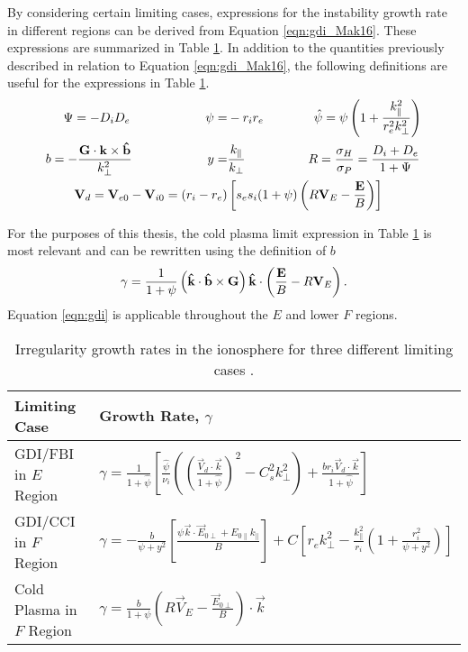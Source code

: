 By considering certain limiting cases, expressions for the instability growth rate in different regions can be derived from Equation \ref{eqn:gdi_Mak16}.  These expressions are summarized in Table \ref{tab:gdi_exps}.  In addition to the quantities previously described in relation to Equation \ref{eqn:gdi_Mak16}, the following definitions are useful for the expressions in Table \ref{tab:gdi_exps}.
\begin{equation}
\begin{split}
	\Psi = -D_iD_e \quad\quad\quad\quad\quad\quad
	\psi =& -r_ir_e \quad\quad\quad\quad
	\hat{\psi} = \psi\left(1+\frac{k_\parallel^2}{r_e^2 k_\perp^2}\right) \\
	b = -\frac{\mathbf{G}\cdot\mathbf{k}\times\mathbf{\hat{b}}}{k_\perp^2} \quad\quad\quad\quad\quad\quad
	y =& \frac{k_\parallel}{k_\perp} \quad\quad\quad\quad\quad
	R = \frac{\sigma_H}{\sigma_P} = \frac{D_i+D_e}{1+\Psi} \\
	\mathbf{V}_d = \mathbf{V}_{e0}-\mathbf{V}_{i0} = (r_i-r_e)&\left[s_es_i(1+\psi)\left(R\mathbf{V}_E-\frac{\mathbf{E}}{B}\right)\right]
\end{split}
\end{equation}

For the purposes of this thesis, the cold plasma limit expression in Table \ref{tab:gdi_exps} is most relevant and can be rewritten using the definition of \(b\) \citep{Makarevich2014c,Makarevich2016a}
\begin{equation}
	\label{eqn:gdi}
	\gamma = \frac{1}{1+\psi}\left(\mathbf{\hat{k}}\cdot\mathbf{\hat{b}}\times\mathbf{G}\right)\mathbf{\hat{k}}\cdot\left(\frac{\mathbf{E}}{B}-R\mathbf{V}_E\right).
\end{equation}
Equation \ref{eqn:gdi} is applicable throughout the \(E\) and lower \(F\) regions.  

\begin{table}
	\centering
	\renewcommand{\arraystretch}{1.5}
	\setlength{\tabcolsep}{15pt}
	\begin{tabular}{l l}
	Limiting Case & Growth Rate, \(\gamma\) \\
	\hline
	GDI/FBI in \(E\) Region & \(\gamma = \frac{1}{1+\hat{\psi}}\left[\frac{\hat{\psi}}{\nu_i}\left(\left(\frac{\vec{V}_d\cdot \vec{k}}{1+\hat{\psi}}\right)^2-C_s^2 k_\perp^2\right)+\frac{br_i\vec{V}_d\cdot \vec{k}}{1+\hat{\psi}}\right]\) \\
	GDI/CCI in \(F\) Region & \(\gamma = -\frac{b}{\psi+y^2}\left[\frac{\psi\vec{k}\cdot\vec{E}_{0\perp}+E_{0\parallel}k_\parallel}{B}\right]+C\left[r_ek_\perp^2-\frac{k_\parallel^2}{r_i}\left(1+\frac{r_i^2}{\psi+y^2}\right)\right]\) \\
	Cold Plasma in \(F\) Region & \(\gamma = \frac{b}{1+\psi}\left(R\vec{V}_E-\frac{\vec{E}_{0\perp}}{B}\right)\cdot\vec{k}\) \\
	\end{tabular}
	\caption[Irregularity growth rates]{Irregularity growth rates in the ionosphere for three different limiting cases \citep{Makarevich2016a}.}
	\label{tab:gdi_exps}
\end{table}

